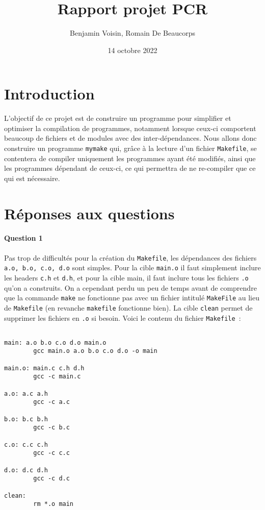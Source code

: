 \documentclass{article}
\title{Rapport projet PCR}
\author{Benjamin Voisin, Romain De Beaucorps}
\date{14 octobre 2022}
\begin{document}
\maketitle

\section{Introduction}

L’objectif de ce projet est de construire un programme pour simplifier et optimiser la compilation de programmes, notamment lorsque ceux-ci comportent beaucoup de fichiers et de modules avec des inter-dépendances. Nous allons donc construire un programme \texttt{mymake} qui, grâce à la lecture d’un fichier \texttt{Makefile}, se contentera de compiler uniquement les programmes ayant été modifiés, ainsi que les programmes dépendant de ceux-ci, ce qui permettra de ne re-compiler que ce qui est nécessaire.

\section{Réponses aux questions}

\paragraph{Question 1} Pas trop de difficultés pour la création du \texttt{Makefile}, les dépendances des fichiers \texttt{a.o, b.o, c.o, d.o} sont simples. Pour la cible \texttt{main.o} il faut simplement inclure les headers \texttt{c.h} et \texttt{d.h}, et pour la cible main, il faut inclure tous les  fichiers \texttt{.o} qu’on a construits. On a cependant perdu un peu de temps avant de comprendre que la commande \texttt{make} ne fonctionne pas avec un fichier intitulé \texttt{MakeFile} au lieu de \texttt{Makefile} (en revanche \texttt{makefile} fonctionne bien). La cible \texttt{clean} permet de supprimer les fichiers en \texttt{.o} si besoin. Voici le contenu du fichier \texttt{Makefile}~:

\begin{verbatim}

main: a.o b.o c.o d.o main.o 
        gcc main.o a.o b.o c.o d.o -o main

main.o: main.c c.h d.h
        gcc -c main.c

a.o: a.c a.h
        gcc -c a.c

b.o: b.c b.h 
        gcc -c b.c

c.o: c.c c.h
        gcc -c c.c

d.o: d.c d.h
        gcc -c d.c

clean:
        rm *.o main

\end{verbatim}
\end{document}
